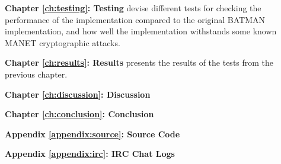 \textbf{Chapter \ref{ch:testing}: Testing} devise different tests for checking
the performance of the implementation compared to the original \ac{BATMAN}
implementation, and how well the implementation withstands some known \ac{MANET}
cryptographic attacks.

\textbf{Chapter \ref{ch:results}: Results} presents the results of the tests
from the previous chapter.

\textbf{Chapter \ref{ch:discussion}: Discussion}

\textbf{Chapter \ref{ch:conclusion}: Conclusion}

\textbf{Appendix \ref{appendix:source}: Source Code}

\textbf{Appendix \ref{appendix:irc}: IRC Chat Logs}